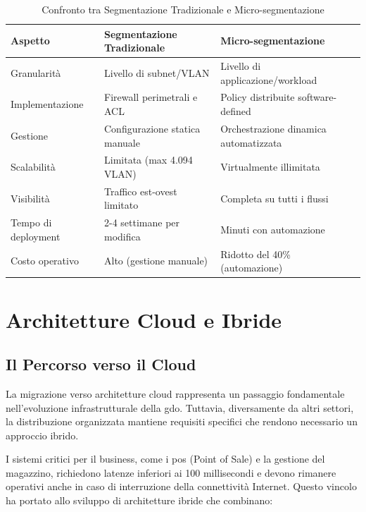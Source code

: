\begin{table}[htbp]
\centering
\caption{Confronto tra Segmentazione Tradizionale e Micro-segmentazione}
\label{tab:segmentation_comparison}
\small
\sffamily
\begin{tabularx}{\textwidth}{X X X}
\toprule
\textbf{Aspetto} & \textbf{Segmentazione Tradizionale} & \textbf{Micro-segmentazione} \\
\midrule
Granularità & Livello di subnet/VLAN & Livello di applicazione/workload \\
Implementazione & Firewall perimetrali e ACL & Policy distribuite software-defined \\
Gestione & Configurazione statica manuale & Orchestrazione dinamica automatizzata \\
Scalabilità & Limitata (max 4.094 VLAN) & Virtualmente illimitata \\
Visibilità & Traffico est-ovest limitato & Completa su tutti i flussi \\
Tempo di deployment & 2-4 settimane per modifica & Minuti con automazione \\
Costo operativo & Alto (gestione manuale) & Ridotto del 40\% (automazione) \\
\bottomrule
\end{tabularx}
\end{table}

\section{\texorpdfstring{Architetture Cloud e Ibride}{3.5 - Architetture Cloud e Ibride}}
\label{sec:cloud_architectures}

\subsection{\texorpdfstring{Il Percorso verso il Cloud}{3.5.1 - Il Percorso verso il Cloud}}
\label{subsec:cloud_journey}

La migrazione verso architetture cloud rappresenta un passaggio fondamentale nell'evoluzione infrastrutturale della \gls{gdo}. Tuttavia, diversamente da altri settori, la distribuzione organizzata mantiene requisiti specifici che rendono necessario un approccio ibrido\autocite{mckinsey2024}.

I sistemi critici per il business, come i \gls{pos} (Point of Sale) e la gestione del magazzino, richiedono latenze inferiori ai 100 millisecondi e devono rimanere operativi anche in caso di interruzione della connettività Internet. Questo vincolo ha portato allo sviluppo di architetture ibride che combinano:

